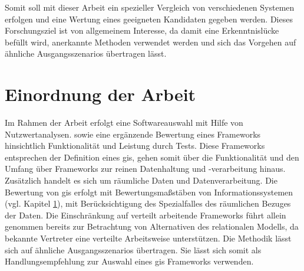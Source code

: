 Somit soll mit dieser Arbeit ein spezieller Vergleich von verschiedenen Systemen erfolgen und eine Wertung eines geeigneten Kandidaten gegeben werden.
Dieses Forschungsziel ist von allgemeinem Interesse, da damit eine Erkenntnislücke befüllt wird, anerkannte Methoden verwendet werden und sich das Vorgehen auf ähnliche Ausgangsszenarios übertragen lässt.

\section{Einordnung der Arbeit}
Im Rahmen der Arbeit erfolgt eine Softwareauswahl mit Hilfe von Nutzwertanalysen.
 sowie eine ergänzende Bewertung eines Frameworks hinsichtlich Funktionalität und Leistung durch Tests.
Diese Frameworks entsprechen der Definition eines \Gls{gis}, gehen somit über die Funktionalität und den Umfang über Frameworks zur reinen Datenhaltung und -ver\-ar\-beitung hinaus.
Zusätzlich handelt es sich um räumliche Daten und Datenverarbeitung.
Die Bewertung von \Gls{gis} erfolgt mit Bewertungsmaßstäben von Informationssystemen (vgl. Kapitel \ref{}), mit Berücksichtigung des Spezialfalles des räumlichen Bezuges der Daten.
Die Einschränkung auf verteilt arbeitende Frameworks führt allein genommen bereits zur Betrachtung von Alternativen des relationalen Modells, da bekannte Vertreter eine verteilte Arbeitsweise unterstützen.
Die Methodik lässt sich auf ähnliche Ausgangsszenarios übertragen.
Sie lässt sich somit als Handlungsempfehlung zur Auswahl eines \Gls{gis} Frameworks verwenden.

